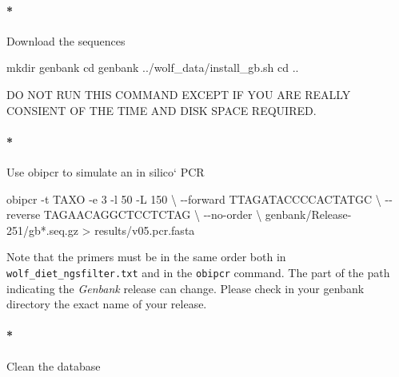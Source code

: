 \documentclass[
  letterpaper,
  DIV=11,
  numbers=noendperiod]{scrreprt}
\let\oldparagraph\paragraph
\renewcommand{\paragraph}[1]{\oldparagraph{#1}\mbox{}}
\newenvironment{Shaded}{\begin{snugshade}}{\end{snugshade}}
\newcommand{\AttributeTok}[1]{\textcolor[rgb]{0.40,0.45,0.13}{#1}}
\newcommand{\BuiltInTok}[1]{\textcolor[rgb]{0.00,0.23,0.31}{#1}}
\newcommand{\DataTypeTok}[1]{\textcolor[rgb]{0.68,0.00,0.00}{#1}}
\newcommand{\ExtensionTok}[1]{\textcolor[rgb]{0.00,0.23,0.31}{#1}}
\newcommand{\FunctionTok}[1]{\textcolor[rgb]{0.28,0.35,0.67}{#1}}
\newcommand{\NormalTok}[1]{\textcolor[rgb]{0.00,0.23,0.31}{#1}}
\newcommand{\OperatorTok}[1]{\textcolor[rgb]{0.37,0.37,0.37}{#1}}
\newcommand{\PreprocessorTok}[1]{\textcolor[rgb]{0.68,0.00,0.00}{#1}}
\begin{document}
\hypertarget{download-the-sequences}{%
\paragraph*{Download the sequences}\label{download-the-sequences}}

\begin{Shaded}
\begin{Highlighting}[]
\FunctionTok{mkdir}\NormalTok{ genbank}
\BuiltInTok{cd}\NormalTok{ genbank}
\ExtensionTok{../wolf\_data/install\_gb.sh}
\BuiltInTok{cd}\NormalTok{ ..}
\end{Highlighting}
\end{Shaded}

DO NOT RUN THIS COMMAND EXCEPT IF YOU ARE REALLY CONSIENT OF THE TIME
AND DISK SPACE REQUIRED.

\hypertarget{use-obipcr-to-simulate-an-in-silico-pcr}{%
\paragraph*{Use obipcr to simulate an in silico`
PCR}\label{use-obipcr-to-simulate-an-in-silico-pcr}}

\begin{Shaded}
\begin{Highlighting}[]
\ExtensionTok{obipcr} \AttributeTok{{-}t}\NormalTok{ TAXO }\AttributeTok{{-}e}\NormalTok{ 3 }\AttributeTok{{-}l}\NormalTok{ 50 }\AttributeTok{{-}L}\NormalTok{ 150 }\DataTypeTok{\textbackslash{} }
       \ExtensionTok{{-}{-}forward}\NormalTok{ TTAGATACCCCACTATGC }\DataTypeTok{\textbackslash{}}
       \AttributeTok{{-}{-}reverse}\NormalTok{ TAGAACAGGCTCCTCTAG }\DataTypeTok{\textbackslash{}}
       \AttributeTok{{-}{-}no{-}order} \DataTypeTok{\textbackslash{}}
\NormalTok{       genbank/Release{-}251/gb}\PreprocessorTok{*}\NormalTok{.seq.gz}
       \OperatorTok{\textgreater{}}\NormalTok{ results/v05.pcr.fasta}
\end{Highlighting}
\end{Shaded}

Note that the primers must be in the same order both in
\texttt{wolf\_diet\_ngsfilter.txt} and in the \texttt{obipcr} command.
The part of the path indicating the \emph{Genbank} release can change.
Please check in your genbank directory the exact name of your release.

\hypertarget{clean-the-database}{%
\paragraph*{Clean the database}\label{clean-the-database}}
\end{document}
